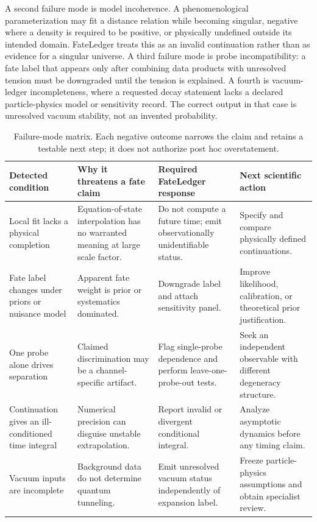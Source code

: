 \documentclass[conference]{IEEEtran}
\begin{document}
A second failure mode is model incoherence. A phenomenological parameterization may fit a distance relation while becoming singular, negative where a density is required to be positive, or physically undefined outside its intended domain. FateLedger treats this as an invalid continuation rather than as evidence for a singular universe. A third failure mode is probe incompatibility: a fate label that appears only after combining data products with unresolved tension must be downgraded until the tension is explained. A fourth is vacuum-ledger incompleteness, where a requested decay statement lacks a declared particle-physics model or sensitivity record. The correct output in that case is unresolved vacuum stability, not an invented probability.

\begin{table}[t]
\caption{Failure-mode matrix. Each negative outcome narrows the claim and retains a testable next step; it does not authorize post hoc overstatement.}
\label{tab:failure-modes}
\centering
\footnotesize
\setlength{\tabcolsep}{3pt}
\begin{tabular}{p{} p{} p{} p{}}
\hline
\textbf{Detected condition} & \textbf{Why it threatens a fate claim} & \textbf{Required FateLedger response} & \textbf{Next scientific action}\\
\hline
Local fit lacks a physical completion & Equation-of-state interpolation has no warranted meaning at large scale factor. & Do not compute a future time; emit observationally unidentifiable status. & Specify and compare physically defined continuations.\\
Fate label changes under priors or nuisance model & Apparent fate weight is prior or systematics dominated. & Downgrade label and attach sensitivity panel. & Improve likelihood, calibration, or theoretical prior justification.\\
One probe alone drives separation & Claimed discrimination may be a channel-specific artifact. & Flag single-probe dependence and perform leave-one-probe-out tests. & Seek an independent observable with different degeneracy structure.\\
Continuation gives an ill-conditioned time integral & Numerical precision can disguise unstable extrapolation. & Report invalid or divergent conditional integral. & Analyze asymptotic dynamics before any timing claim.\\
Vacuum inputs are incomplete & Background data do not determine quantum tunneling. & Emit unresolved vacuum status independently of expansion label. & Freeze particle-physics assumptions and obtain specialist review.\\
\hline
\end{tabular}
\end{table}
\end{document}
